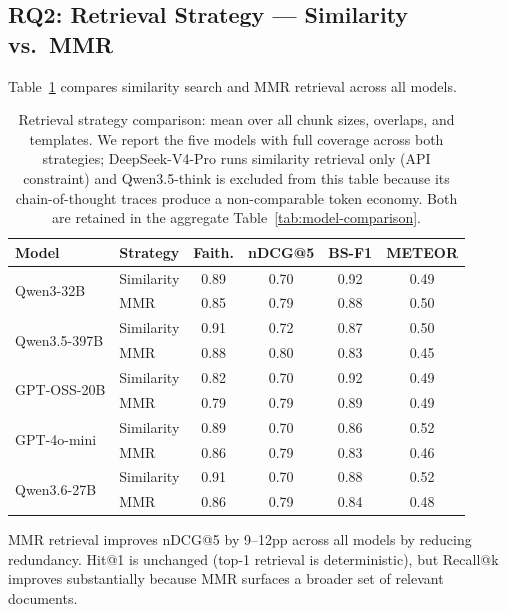 \subsection{RQ2: Retrieval Strategy --- Similarity vs.\ MMR}

Table~\ref{tab:retrieval} compares similarity search and MMR retrieval across all models.

\begin{table}[t]
\centering
\caption{Retrieval strategy comparison: mean over all chunk sizes, overlaps, and templates. We report the five models with full coverage across both strategies; DeepSeek-V4-Pro runs similarity retrieval only (API constraint) and Qwen3.5-think is excluded from this table because its chain-of-thought traces produce a non-comparable token economy. Both are retained in the aggregate Table~\ref{tab:model-comparison}.}
\label{tab:retrieval}
\begin{tabular}{llcccc}
\toprule
\textbf{Model} & \textbf{Strategy} & \textbf{Faith.} & \textbf{nDCG@5} & \textbf{BS-F1} & \textbf{METEOR} \\
\midrule
\multirow{2}{*}{Qwen3-32B}    & Similarity & 0.89 & 0.70 & 0.92 & 0.49 \\
                               & MMR        & 0.85 & 0.79 & 0.88 & 0.50 \\
\multirow{2}{*}{Qwen3.5-397B} & Similarity & 0.91 & 0.72 & 0.87 & 0.50 \\
                               & MMR        & 0.88 & 0.80 & 0.83 & 0.45 \\
\multirow{2}{*}{GPT-OSS-20B}  & Similarity & 0.82 & 0.70 & 0.92 & 0.49 \\
                               & MMR        & 0.79 & 0.79 & 0.89 & 0.49 \\
\multirow{2}{*}{GPT-4o-mini}  & Similarity & 0.89 & 0.70 & 0.86 & 0.52 \\
                               & MMR        & 0.86 & 0.79 & 0.83 & 0.46 \\
\multirow{2}{*}{Qwen3.6-27B}  & Similarity & 0.91 & 0.70 & 0.88 & 0.52 \\
                               & MMR        & 0.86 & 0.79 & 0.84 & 0.48 \\
\bottomrule
\end{tabular}
\end{table}

MMR retrieval improves nDCG@5 by 9--12pp across all models by reducing redundancy. Hit@1 is unchanged (top-1 retrieval is deterministic), but Recall@k improves substantially because MMR surfaces a broader set of relevant documents.

